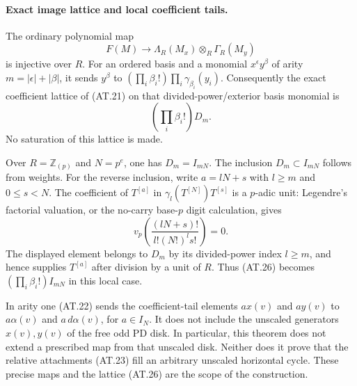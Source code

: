 \paragraph{Exact image lattice and local coefficient tails.}
The ordinary polynomial map
\[
 F(M)\longrightarrow
 \Lambda_R(M_x)\otimes_R\Gamma_R(M_y)
\]
is injective over $R$. For an ordered basis and a
monomial $x^\epsilon y^\beta$ of arity
$m=|\epsilon|+|\beta|$, it sends
$y^\beta$ to
$(\prod_i\beta_i!)\prod_i\gamma_{\beta_i}(y_i)$.
Consequently the exact coefficient lattice of
(AT.21) on that divided-power/exterior basis
monomial is
\[
 \left(\prod_i\beta_i!\right)D_m.
 \tag{AT.26}
\]
No saturation of this lattice is made.

Over $R=\mathbb Z_{(p)}$ and $N=p^e$, one has
$D_m=I_{mN}$. The inclusion $D_m\subset I_{mN}$
follows from weights. For the reverse inclusion,
write $a=lN+s$ with $l\geq m$ and $0\leq s<N$.
The coefficient of $T^{[a]}$ in
$\gamma_l(T^{[N]})T^{[s]}$ is a $p$-adic unit:
Legendre's factorial valuation, or the no-carry
base-$p$ digit calculation, gives
\[
 v_p\!\left(\frac{(lN+s)!}{l!(N!)^l s!}\right)=0.
\]
The displayed element belongs to $D_m$ by its
divided-power index $l\geq m$, and hence supplies
$T^{[a]}$ after division by a unit of $R$.
Thus (AT.26) becomes
$(\prod_i\beta_i!)I_{mN}$ in this local case.

In arity one (AT.22) sends the coefficient-tail
elements $a x(v)$ and $a y(v)$ to
$a\alpha(v)$ and $a\,d\alpha(v)$, for $a\in I_N$.
It does not include the unscaled generators
$x(v),y(v)$ of the free odd PD disk. In particular,
this theorem does not extend a prescribed map
from that unscaled disk. Neither does it prove
that the relative attachments (AT.23) fill an
arbitrary unscaled horizontal cycle. These
precise maps and the lattice (AT.26) are the
scope of the construction.
